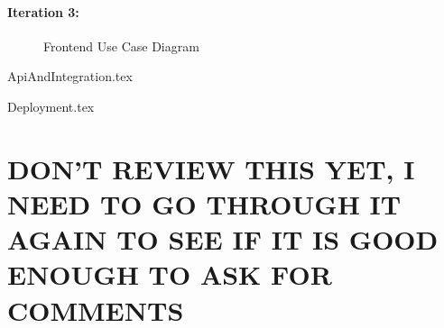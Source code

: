 \subsubsection{Iteration 3:}

\begin{figure}[h]
    \centering
    \caption{Frontend Use Case Diagram}
    \label{fig:frontend_usecase}
\end{figure}

{ApiAndIntegration.tex}

{Deployment.tex}
\chapter{DON'T REVIEW THIS YET, I NEED TO GO THROUGH IT AGAIN TO SEE IF IT IS GOOD ENOUGH TO ASK FOR COMMENTS}